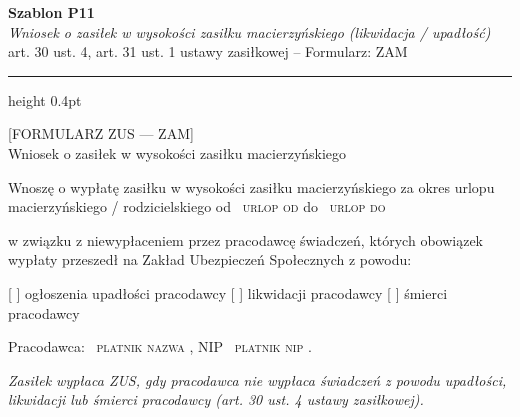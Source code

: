 \documentclass[11pt,a4paper]{article}
\newcommand{\Pole}[1]{%
  \textcolor{szary}{\dotfill}\,%
  {\scriptsize\textcolor{szary}{\textsc{#1}}}%
}
\begin{document}
\begin{flushright}
{\footnotesize\color{szary}
\textbf{Szablon P11}\\
{\itshape Wniosek o zasiłek w wysokości zasiłku macierzyńskiego (likwidacja / upadłość)}\\
art. 30 ust. 4, art. 31 ust. 1 ustawy zasiłkowej -- Formularz: ZAM}\
\end{flushright}

\vspace{0.5em}
{\color{ramka}\hrule height 0.4pt}
\vspace{0.8em}

[FORMULARZ ZUS --- ZAM]\\[-2pt]
Wniosek o zasiłek w wysokości zasiłku macierzyńskiego

Wnoszę o wypłatę zasiłku w wysokości zasiłku macierzyńskiego za okres
urlopu macierzyńskiego / rodzicielskiego od \Pole{urlop od} do \Pole{urlop do}
w związku z niewypłaceniem przez pracodawcę świadczeń, których obowiązek
wypłaty przeszedł na Zakład Ubezpieczeń Społecznych z powodu:

[ ] ogłoszenia upadłości pracodawcy
[ ] likwidacji pracodawcy
[ ] śmierci pracodawcy

Pracodawca: \Pole{platnik nazwa}, NIP \Pole{platnik nip}.

\vfill
{\footnotesize\textcolor{szary}\itshape Zasiłek wypłaca ZUS, gdy pracodawca nie wypłaca świadczeń z powodu upadłości, likwidacji lub śmierci pracodawcy (art. 30 ust. 4 ustawy zasiłkowej). }
\end{document}
